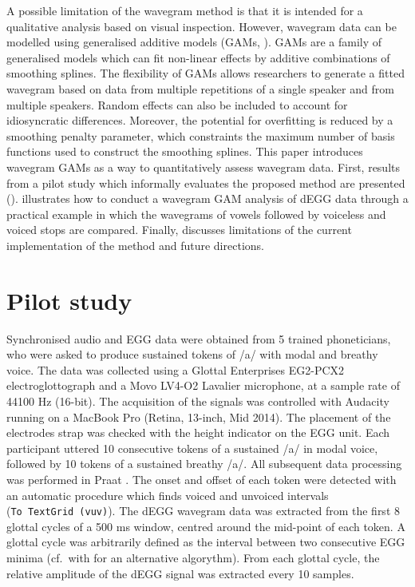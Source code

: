 \documentclass[
  11pt,
  a4paper,
]{article}
\begin{document}
A possible limitation of the wavegram method is that it is intended for
a qualitative analysis based on visual inspection. However, wavegram
data can be modelled using generalised additive models (GAMs,
\citealt{hastie1986, zuur2012, wood2017}). GAMs are a family of
generalised models which can fit non-linear effects by additive
combinations of smoothing splines. The flexibility of GAMs allows
researchers to generate a fitted wavegram based on data from multiple
repetitions of a single speaker and from multiple speakers. Random
effects can also be included to account for idiosyncratic differences.
Moreover, the potential for overfitting is reduced by a smoothing
penalty parameter, which constraints the maximum number of basis
functions used to construct the smoothing splines. This paper introduces
wavegram GAMs as a way to quantitatively assess wavegram data. First,
results from a pilot study which informally evaluates the proposed
method are presented ().  illustrates how
to conduct a wavegram GAM analysis of dEGG data through a practical
example in which the wavegrams of vowels followed by voiceless and
voiced stops are compared. Finally,  discusses
limitations of the current implementation of the method and future
directions.

\hypertarget{pilot-study}{%
\section{Pilot study}\label{pilot-study}}

\label{s:pilot}

Synchronised audio and EGG data were obtained from 5 trained
phoneticians, who were asked to produce sustained tokens of /a/ with
modal and breathy voice. The data was collected using a Glottal
Enterprises EG2-PCX2 electroglottograph and a Movo LV4-O2 Lavalier
microphone, at a sample rate of 44100 Hz (16-bit). The acquisition of
the signals was controlled with Audacity running on a MacBook Pro
(Retina, 13-inch, Mid 2014). The placement of the electrodes strap was
checked with the height indicator on the EGG unit. Each participant
uttered 10 consecutive tokens of a sustained /a/ in modal voice,
followed by 10 tokens of a sustained breathy /a/. All subsequent data
processing was performed in Praat \citep{boersma2018}. The onset and
offset of each token were detected with an automatic procedure which
finds voiced and unvoiced intervals (\texttt{To\ TextGrid\ (vuv)}). The
dEGG wavegram data was extracted from the first 8 glottal cycles of a
500 ms window, centred around the mid-point of each token. A glottal
cycle was arbitrarily defined as the interval between two consecutive
EGG minima (cf.~with \citealt{herbst2010} for an alternative algorythm).
From each glottal cycle, the relative amplitude of the dEGG signal was
extracted every 10 samples.
\end{document}

